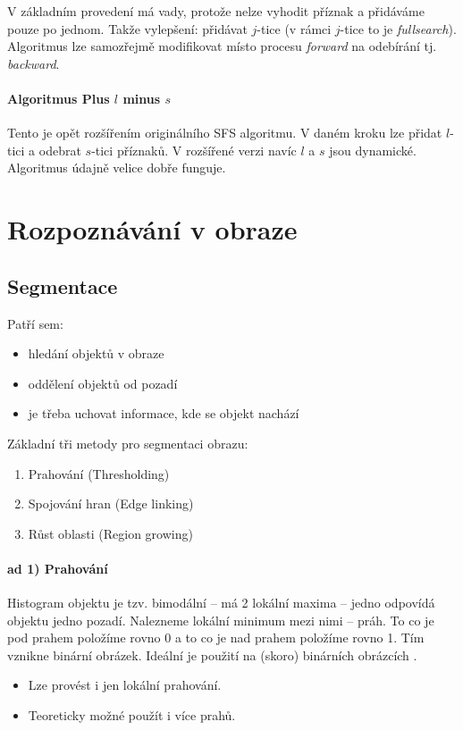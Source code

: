 V základním provedení má vady, protože nelze vyhodit příznak a přidáváme pouze po jednom. Takže vylepšení:
přidávat $j$-tice (v rámci $j$-tice to je \emph{fullsearch}). Algoritmus lze samozřejmě modifikovat 
místo procesu \emph{forward} na odebírání tj. \emph{backward}.

\paragraph{Algoritmus Plus $l$ minus $s$}
Tento je opět rozšířením originálního SFS algoritmu. V daném kroku lze přidat $l$-tici a odebrat $s$-tici příznaků.
V rozšířené verzi navíc $l$ a $s$ jsou dynamické. Algoritmus údajně velice dobře funguje. 

\section{Rozpoznávání v obraze}
\subsection{Segmentace}
Patří sem:
\begin{itemize}
	\item hledání objektů v obraze
	\item oddělení objektů od pozadí
	\item je třeba uchovat informace, kde se objekt nachází
\end{itemize}

Základní tři metody pro segmentaci obrazu:
\begin{enumerate}
	\item Prahování (Thresholding)
	\item Spojování hran (Edge linking)
	\item Růst oblasti (Region growing)
\end{enumerate}

\paragraph{ad 1) Prahování}
Histogram objektu je tzv. bimodální -- má 2 lokální maxima -- jedno odpovídá objektu jedno pozadí. Nalezneme lokální minimum mezi nimi -- práh. To co je pod prahem položíme rovno 0 a to co je nad prahem položíme rovno 1. Tím vznikne binární obrázek. Ideální je použití na (skoro) binárních obrázcích .
\begin{itemize}
	\item Lze provést i jen lokální prahování.
	\item Teoreticky možné použít i více prahů.
\end{itemize}


